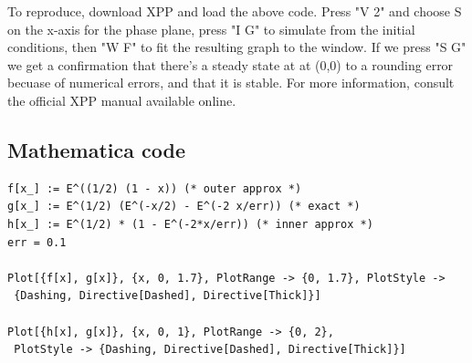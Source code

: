 \documentclass[12pt]{article}
\begin{document}
To reproduce, download XPP and load the above code. Press "V 2" and
choose S on the x-axis for the phase plane, press "I G" to simulate
from the initial conditions, then "W F" to fit the resulting graph to
the window. If we press "S G" we get a confirmation that there's a
steady state at at (0,0) to a rounding error becuase of numerical
errors, and that it is stable. For more information, consult the
official XPP manual available online.

\subsection{Mathematica code}
\begin{verbatim}
f[x_] := E^((1/2) (1 - x)) (* outer approx *)
g[x_] := E^(1/2) (E^(-x/2) - E^(-2 x/err)) (* exact *)
h[x_] := E^(1/2) * (1 - E^(-2*x/err)) (* inner approx *)
err = 0.1

Plot[{f[x], g[x]}, {x, 0, 1.7}, PlotRange -> {0, 1.7}, PlotStyle ->
 {Dashing, Directive[Dashed], Directive[Thick]}]

Plot[{h[x], g[x]}, {x, 0, 1}, PlotRange -> {0, 2}, 
 PlotStyle -> {Dashing, Directive[Dashed], Directive[Thick]}]
\end{verbatim}
\end{document}

